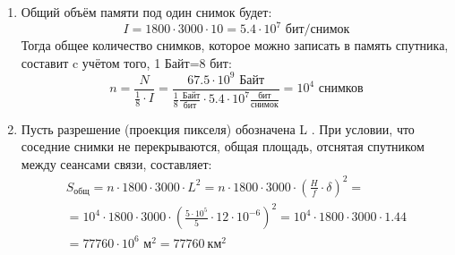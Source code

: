 \solutionSection

\begin{enumerate}
    \item Общий объём памяти под один снимок будет:
    $$I=1800\cdot3000\cdot10=5.4\cdot10^7 \text{  бит/снимок}$$
    Тогда общее количество снимков, которое можно записать в память спутника, составит c учётом того,  1 Байт=8 бит:
    $$n=\frac{N}{\frac{1}{8}\cdot I}=\frac{67.5\cdot10^9\text{ Байт}}{\frac{1}{8}\frac{\text{ Байт}}{\text{бит}}\cdot5.4\cdot10^7 \frac{\text{бит}}{\text{снимок}}}=10^4\text{ снимков}$$
    \item Пусть разрешение (проекция пикселя) обозначена L . При условии, что соседние снимки не перекрываются, общая площадь, отснятая спутником между сеансами связи, составляет:
    \begin{eqnarray}\nonumber
    S_\text{общ}=n\cdot1800\cdot3000\cdot L^2=n\cdot1800\cdot3000\cdot\left(\frac{H}{f} \cdot\delta\right)^2=
    \\\nonumber
    =10^4\cdot1800\cdot3000\cdot\left(\frac{5\cdot10^5}{5}\cdot12\cdot10^{-6} \right)^2=10^4\cdot1800\cdot3000\cdot1.44
    \\\nonumber
    =77760\cdot10^6\text{ м}^2=77760 \: \text{км}^2
    \end{eqnarray}


\end{enumerate}
